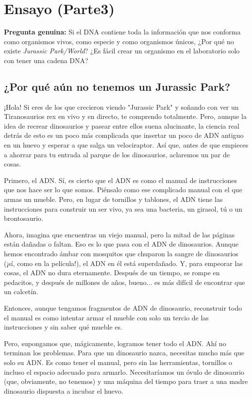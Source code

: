 \section*{Ensayo (Parte3)} %
\label{sec:parte3} %

\textbf{Pregunta genuina:} Si el DNA contiene toda la información que nos conforma como organismos vivos, como especie y como organismos únicos, ¿Por qué no existe \textit{Jurassic Park/World}? ¿Es fácil crear un organismo en el laboratorio solo con tener una cadena DNA?


\subsection*{¿Por qué aún no tenemos un Jurassic Park?}

¡Hola! Si eres de los que crecieron viendo "Jurassic Park" y soñando con ver un Tiranosaurios rex en vivo y en directo, te comprendo totalmente. Pero, aunque la idea de recrear dinosaurios y pasear entre ellos suena alucinante, la ciencia real detrás de esto es un poco más complicada que insertar un poco de ADN antiguo en un huevo y esperar a que salga un velociraptor. Así que, antes de que empieces a ahorrar para tu entrada al parque de los dinosaurios, aclaremos un par de cosas.

Primero, el ADN. Sí, es cierto que el ADN es como el manual de instrucciones que nos hace ser lo que somos. Piénsalo como ese complicado manual con el que armas un mueble. Pero, en lugar de tornillos y tablones, el ADN tiene las instrucciones para construir un ser vivo, ya sea una bacteria, un girasol, tú o un brontosaurio.

Ahora, imagina que encuentras un viejo manual, pero la mitad de las páginas están dañadas o faltan. Eso es lo que pasa con el ADN de dinosaurios. Aunque hemos encontrado ámbar con mosquitos que chuparon la sangre de dinosaurios (¡sí, como en la película!), el ADN en él está superdañado. Y, para empeorar las cosas, el ADN no dura eternamente. Después de un tiempo, se rompe en pedacitos, y después de millones de años, bueno... es más difícil de encontrar que un calcetín.

Entonces, aunque tengamos fragmentos de ADN de dinosaurio, reconstruir todo el manual es como intentar armar el mueble con solo un tercio de las instrucciones y sin saber qué mueble es.

Pero, supongamos que, mágicamente, logramos tener todo el ADN. Ahí no terminan los problemas. Para que un dinosaurio nazca, necesitas mucho más que solo su ADN. Es como tener el manual, pero sin las herramientas, tornillos o incluso el espacio adecuado para armarlo. Necesitaríamos un óvulo de dinosaurio (que, obviamente, no tenemos) y una máquina del tiempo para traer a una madre dinosaurio dispuesta a incubar el huevo.

